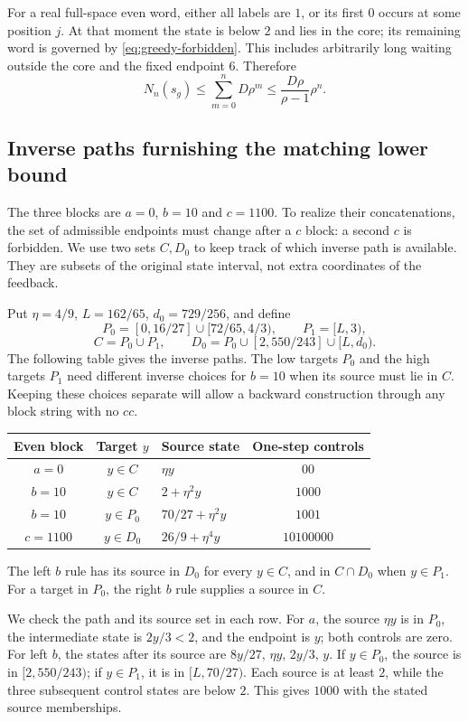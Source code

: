 \documentclass[11pt,reqno]{amsart}
\numberwithin{equation}{section}
\theoremstyle{definition}
\theoremstyle{definition}
\begin{document}
For a real full-space even word, either all labels are $1$, or its
first $0$ occurs at some position $j$. At that moment the state
is below $2$ and lies in the core; its remaining word is governed
by \eqref{eq:greedy-forbidden}. This includes arbitrarily long
waiting outside the core and the fixed endpoint $6$.
Therefore
\begin{equation}\label{eq:greedy-upper}
 N_n(s_g)\le\sum_{m=0}^n D\rho^m
 \le\frac{D\rho}{\rho-1}\rho^n.
\end{equation}
\subsection*{Inverse paths furnishing the matching lower bound}
The three blocks are $a=0$, $b=10$ and $c=1100$. To realize their
concatenations, the set of admissible endpoints must change after a
$c$ block: a second $c$ is forbidden. We use two sets $C,D_0$ to
keep track of which inverse path is available. They are subsets of
the original state interval, not extra coordinates of the feedback.

Put $\eta=4/9$, $L=162/65$, $d_0=729/256$, and define
\[
 P_0=[0,16/27]\cup[72/65,4/3),\qquad P_1=[L,3),
\]
\[
 C=P_0\cup P_1,\qquad
 D_0=P_0\cup[2,550/243]\cup[L,d_0).
\]
The following table gives the inverse paths. The low targets $P_0$ and the high targets $P_1$ need different
inverse choices for $b=10$ when its source must lie in $C$.
Keeping these choices separate will allow a backward construction
through any block string with no $cc$.
\begin{center}
\begin{tabular}{cclc}
\toprule
Even block&Target $y$&Source state&One-step controls\\
\midrule
$a=0$&$y\in C$&$\eta y$&$00$\\
$b=10$&$y\in C$&$2+\eta^2y$&$1000$\\
$b=10$&$y\in P_0$&$70/27+\eta^2y$&$1001$\\
$c=1100$&$y\in D_0$&$26/9+\eta^4y$&$10100000$\\
\bottomrule
\end{tabular}
\end{center}
The left $b$ rule has its source in $D_0$ for every $y\in C$,
and in $C\cap D_0$ when $y\in P_1$. For a target in $P_0$,
the right $b$ rule supplies a source in $C$.

We check the path and its source set in each row. For $a$, the source
$\eta y$ is in $P_0$, the intermediate state is $2y/3<2$,
and the endpoint is $y$; both controls are zero.
For left $b$, the states after its source are
$8y/27$, $\eta y$, $2y/3$, $y$. If $y\in P_0$, the
source is in $[2,550/243)$; if $y\in P_1$, it is in
$[L,70/27)$. Each source is at least $2$, while the three subsequent control states are
below $2$. This gives $1000$ with the stated source memberships.
\end{document}
